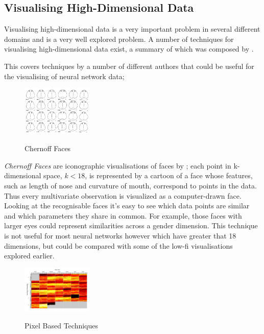 \documentclass[a4paper,11pt,titlepage]{article}
\begin{document}
\subsection{Visualising High-Dimensional Data}
	Visualising high-dimensional data is a very important problem in several different domains and is a very well explored problem. A number of techniques for visualising high-dimensional data exist, a summary of which was composed by \cite{Cristina2003}.
	\par 
	This covers techniques by a number of different authors that could be useful for the visualising of neural network data;	
		\par
		
 	\begin{figure}[H]
    			\centering	
			{{\includegraphics[width=0.3\textwidth]
    				{img/chernoff_faces} 
    			}}%
    			\caption{Chernoff Faces}%
    		\label{fig:lascaux}
	\end{figure}
 		
		 \textit{Chernoff Faces} are iconographic visualisations of faces by \cite{Chernoff1973}; each point in k-dimensional space, $ k < 18 $, is represented by a cartoon of a face whose features, such as length of nose and curvature of mouth, correspond to points in the data. Thus every multivariate observation is visualized as a computer-drawn face. Looking at the recognisable faces it's easy to see which data points are similar and which parameters they share in common. For example, those faces with larger eyes could represent similarities across a gender dimension. This technique is not useful for most neural networks however which have greater that 18 dimensions, but could be compared with some of the low-fi visualisations explored earlier.
		 \par
 		
 	\begin{figure}[H]
    			\centering	
			{{\includegraphics[width=0.3\textwidth]
    				{img/kiem_pixel_two} 
    			}}%
    			\caption{Pixel Based Techniques}%
    		\label{fig:lascaux}
	\end{figure}	
 		
\end{document}
